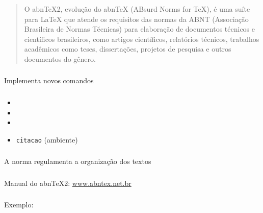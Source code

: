 \begin{frame}[standout]
  \Huge
\end{frame}

\begin{frame}
  \frametitle{}
  \large
  \begin{quote}
    O abnTeX2, evolução do abnTeX (ABsurd Norms for TeX), é uma suíte para
    LaTeX que atende os requisitos das normas da ABNT (Associação Brasileira de
    Normas Técnicas) para elaboração de documentos técnicos e científicos
    brasileiros, como artigos científicos, relatórios técnicos, trabalhos
    acadêmicos como teses, dissertações, projetos de pesquisa e outros
    documentos do gênero.
  \end{quote}
\end{frame}

\begin{frame}
  \frametitle{}
  \Huge
  Implementa novos comandos
\end{frame}

\begin{frame}
  \frametitle{}
  \Huge
  \begin{itemize}
    \item\texttt{\titulo}
    \item\texttt{\autor}
    \item\texttt{\imprimircapa}
    \item\texttt{citacao} (ambiente)
  \end{itemize}
\end{frame}

\begin{frame}
  \frametitle{}
  \Huge
  A norma regulamenta a organização dos textos
\end{frame}

\begin{frame}
  \frametitle{}
  \Huge
  Manual do abnTeX2: \url{www.abntex.net.br}
\end{frame}

\begin{frame}
  \frametitle{}
  \Huge
  Exemplo: 
\end{frame}
